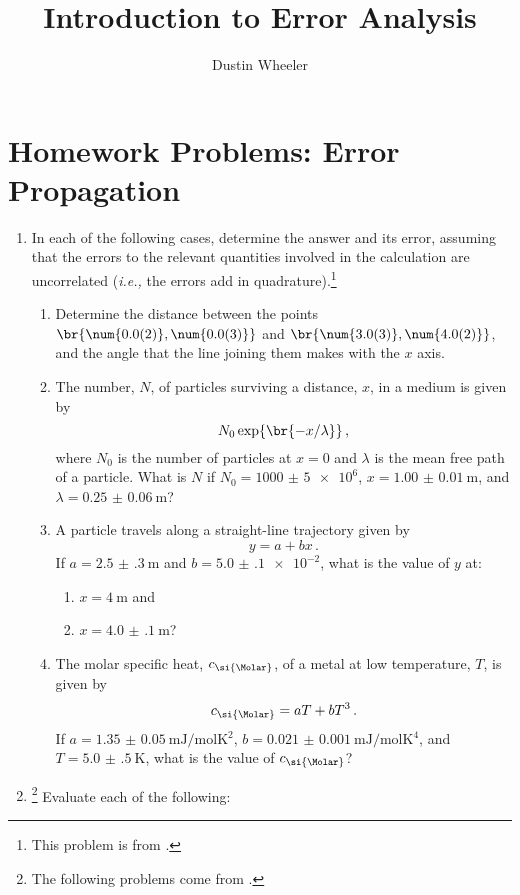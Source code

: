 \documentclass[nobib,nofonts,nols,nohyper]{tufte-handout}
\title{Introduction to Error Analysis}
\author{Dustin Wheeler}
\begin{document}
\maketitle

\section{Homework Problems: Error Propagation} %
\label{sec:homework_problems_error_propagation}

\begin{enumerate}
	\item In each of the following cases, determine the answer and its error, assuming that the errors to the relevant quantities involved in the calculation are uncorrelated (\emph{i.e.,} the errors add in quadrature).\footnote{This problem is from \autocite{lyons1991data}.}
	\begin{enumerate}
		\item Determine the distance between the points \( \br{\num{0.0(2)}, \num{0.0(3)}} \) and \( \br{\num{3.0(3)}, \num{4.0(2)}} \), and the angle that the line joining them makes with the \( x \) axis. 
		\item The number, \( N \), of particles surviving a distance, \( x \), in a medium is given by \[ 
		N_0 \exp\br{-x/\lambda} \, ,
		\] 
		where \( N_0 \) is the number of particles at \( x = 0 \) and \( \lambda \) is the mean free path of a particle. 
		What is \( N \) if \( N_0=\num{1000(5)e6} \), \( x = \SI{1.00(1)}{\m} \), and \( \lambda = \SI{0.25(6)}{\m} \)?
		\item A particle travels along a straight-line trajectory given by \[
		 y = a + bx \, .
		 \] 
		If \( a = \SI{2.5(3)}{\m} \) and \( b = \num{5.0(1)e-2} \), what is the value of \( y \) at:
		\begin{enumerate}
			\item \( x = \SI{4}{\m} \) and
			\item \( x = \SI{4.0(1)}{\m} \)?
		\end{enumerate}
		\item The molar specific heat, \( c_{\si{\Molar}} \), of a metal at low temperature, \( T \), is given by \[
			c_{\si{\Molar}} = a T + b T^3 \, . 
		\]
		If \( a = \SI{1.35(5)}{\mJ\per\mol\K^2} \), \( b = \SI{0.021(1)}{\mJ\per\mol\K^4} \), and \( T = \SI{5.0(5)}{\K} \), what is the value of \( c_{\si{\Molar}} \)?
	\end{enumerate}
	\item\footnote{The following problems come from \autocite{taylor1997error}.} Evaluate each of the following:

\end{enumerate}
\end{document}
